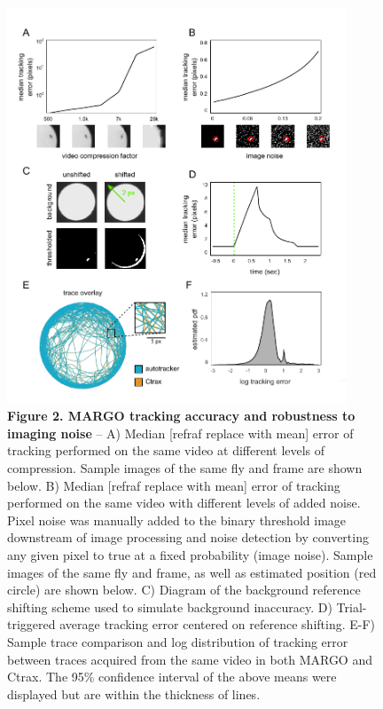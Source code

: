 \documentclass[10pt]{article}
\begin{document}
\newpage
\begin{figure}[h!]
	\begin{center}
		\includegraphics[width=0.9\textwidth]{../figures/autotracker_performance.pdf}
	\end{center}
	\caption*{\footnotesize \textbf{Figure 2. MARGO tracking accuracy and robustness to imaging noise} -- A) Median [refraf replace with mean] error of tracking performed on the same video at different levels of compression. Sample images of the same fly and frame are shown below. B) Median [refraf replace with mean] error of tracking performed on the same video with different levels of added noise. Pixel noise was manually added to the binary threshold image downstream of image processing and noise detection by converting any given pixel to true at a fixed probability (image noise). Sample images of the same fly and frame, as well as estimated position (red circle) are shown below. C) Diagram of the background reference shifting scheme used to simulate background inaccuracy. D) Trial-triggered average tracking error centered on reference shifting. E-F) Sample trace comparison and log distribution of tracking error between traces acquired from the same video in both MARGO and Ctrax. The 95\% confidence interval of the above means were displayed but are within the thickness of lines.}
\end{figure}
\end{document}
